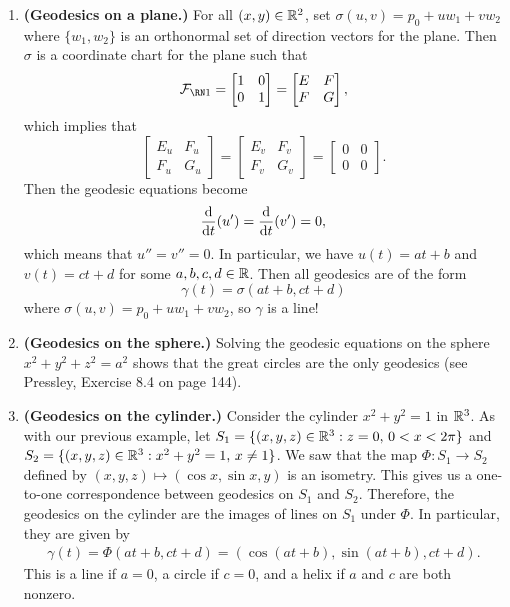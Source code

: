 \begin{enumerate}[(1)]
    \item {\bf (Geodesics on a plane.)} For all $(x, y) \in \mathbb{R}^2$, set 
    $\sigma(u, v) = p_0 + uw_1 + vw_2$ where $\{w_1, w_2\}$ is an orthonormal 
    set of direction vectors for the plane. Then $\sigma$ is a 
    coordinate chart for the plane such that 
    \[ \FFF = \begin{bmatrix}
        1 & 0 \\ 0 & 1 
    \end{bmatrix} = \begin{bmatrix}
        E & F \\ F & G
    \end{bmatrix}, \] 
    which implies that 
    \[ \begin{bmatrix}
        E_u & F_u \\ F_u & G_u
    \end{bmatrix} = \begin{bmatrix}
        E_v & F_v \\ F_v & G_v 
    \end{bmatrix} = \begin{bmatrix}
        0 & 0 \\ 0 & 0
    \end{bmatrix}. \] 
    Then the geodesic equations become 
    \begin{align*}
        \frac{{\rm d}}{{\rm d}t} (u') = \frac{{\rm d}}{{\rm d}t} (v') = 0, 
    \end{align*}
    which means that $u'' = v'' = 0$. In particular, we have 
    $u(t) = at+b$ and $v(t) = ct+d$ for some $a, b, c, d \in \mathbb{R}$. Then 
    all geodesics are of the form 
    \[ \gamma(t) = \sigma(at+b, ct+d) \] 
    where $\sigma(u, v) = p_0 + uw_1 + vw_2$, so $\gamma$ is a line! 

    \item {\bf (Geodesics on the sphere.)} Solving the geodesic equations 
    on the sphere $x^2 + y^2 + z^2 = a^2$ shows that the great circles 
    are the only geodesics (see Pressley, Exercise 8.4 on page 144). 

    \item {\bf (Geodesics on the cylinder.)} Consider the cylinder 
    $x^2 + y^2 = 1$ in $\mathbb{R}^3$. As with our previous example, let 
    $S_1 = \{(x, y, z) \in \mathbb{R}^3 : z=0,\, 0 < x < 2\pi\}$ and 
    $S_2 = \{(x, y, z) \in \mathbb{R}^3 : x^2 + y^2 = 1,\, x \neq 1\}$. 
    We saw that the map $\Phi : S_1 \to S_2$ defined by $(x, y, z) \mapsto
    (\cos x, \sin x, y)$ is an isometry. This gives us a one-to-one correspondence 
    between geodesics on $S_1$ and $S_2$. Therefore, the geodesics on the 
    cylinder are the images of lines on $S_1$ under $\Phi$. 
    In particular, they are given by 
    \begin{align*}
        \gamma(t) 
        = \Phi(at+b, ct+d) = (\cos(at+b), \sin(at+b), ct+d). 
    \end{align*}
    This is a line if $a = 0$, a circle if $c = 0$, and a helix 
    if $a$ and $c$ are both nonzero. 
\end{enumerate}

